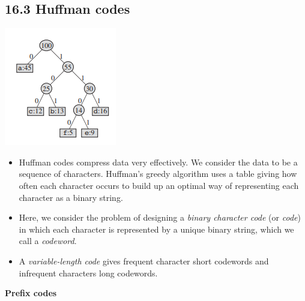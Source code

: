 \documentclass{report}
\begin{document}
\subsection*{16.3 Huffman codes}
\begin{center}
    \item \includegraphics{../entities/huffman_binary_tree.png}
\end{center}
\begin{itemize}
    \item Huffman codes compress data very effectively. We consider the data to be a sequence of characters. Huffman's greedy algorithm uses a table giving how often each character occurs to build up an optimal way of representing each character as a binary string.
    \item Here, we consider the problem of designing a \textit{binary character code} (or \textit{code}) in which each character is represented by a unique binary string, which we call a \textit{codeword}.
    \item A \textit{variable-length code} gives frequent character short codewords and infrequent characters long codewords.
\end{itemize}
\textbf{Prefix codes}
\end{document}
